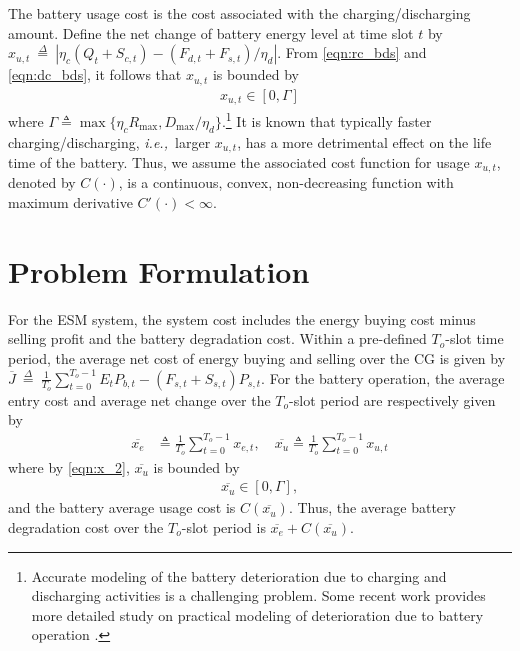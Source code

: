 \documentclass[journal]{IEEEtran}
\def\defeq{~{\stackrel{\Delta}{=}}~}
\def\ie{{\it i.e.,\ \/}}
\begin{document}
The battery usage cost is the cost associated with the charging/discharging amount. Define the net change of battery energy level  at time slot $t$ by  $x_{u,t}\defeq
\left|\eta_c(Q_t+S_{c,t})-(F_{d,t}+F_{s,t})/\eta_d\right|$. From \eqref{eqn:rc_bds} and \eqref{eqn:dc_bds}, it follows that $x_{u,t}$ is bounded by
\begin{align} \label{eqn:x_2}
x_{u,t} \in [0, \Gamma]
\end{align}
where $\Gamma\triangleq \max\{\eta_cR_{\max},D_{\max}/\eta_d\}$.\footnote{Accurate modeling of the battery deterioration due to charging and discharging activities is a challenging problem. Some recent work provides more detailed study on practical modeling of deterioration due to battery operation \cite{Shi&etal:ArXiv2017}.} It is known that typically faster charging/discharging, \ie larger $x_{u,t}$, has a more detrimental effect on the life time of the battery. Thus, we assume the associated cost function for usage $x_{u,t}$, denoted by $C(\cdot)$, is a continuous, convex, non-decreasing function with maximum derivative $C'(\cdot)<\infty$.

\allowdisplaybreaks

\section{ Problem Formulation}\label{sec:FHA}
For the ESM system, the system cost includes the energy buying cost minus selling profit and the battery degradation cost. Within a pre-defined $T_o$-slot time period, the average net cost of energy buying and selling  over the CG  is given by  $\overline{J}\defeq \frac{1}{T_o}\sum_{t=0}^{T_o-1}E_tP_{b,t}-(F_{s,t}+S_{s,t})P_{s,t}$. For the battery operation, the average entry cost and average net change over the $T_o$-slot period are respectively given by
\begin{align} \label{time-avg}
\overline{x_e}
&\triangleq
\frac{1}{T_o}\sum_{t=0}^{T_o-1}x_{e,t}, \quad
\overline{x_u}
\triangleq
\frac{1}{T_o}\sum_{t=0}^{T_o-1}x_{u,t}
\end{align}
where by \eqref{eqn:x_2}, $\overline{x_u}$ is bounded by
\begin{align}
\label{eqn:avg_rc_dc_bds}
\overline{x_u}\in [0, \Gamma],
\end{align}
and the battery average usage cost is $C(\overline{x_u})$. Thus, the average battery degradation cost over the $T_o$-slot period is  $\overline{x_e}+C(\overline{x_u})$.
\end{document}
